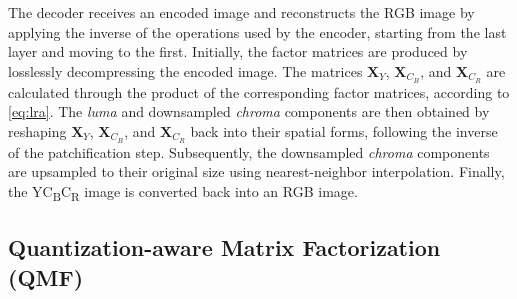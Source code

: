The decoder receives an encoded image and reconstructs the RGB image by applying the inverse of the operations used by the encoder, starting from the last layer and moving to the first. Initially, the factor matrices are produced by losslessly decompressing the encoded image. The matrices $\bm{X}_{Y}$, $\bm{X}_{C_B}$, and $\bm{X}_{C_R}$ are calculated through the product of the corresponding factor matrices, according to \eqref{eq:lra}. The \emph{luma} and downsampled \emph{chroma} components are then obtained by reshaping $\bm{X}_{Y}$, $\bm{X}_{C_B}$, and $\bm{X}_{C_R}$ back into their spatial forms, following the inverse of the patchification step. Subsequently, the downsampled \emph{chroma} components are upsampled to their original size using nearest-neighbor interpolation. Finally, the YC\textsubscript{B}C\textsubscript{R} image is converted back into an RGB image.


\subsection{Quantization-aware Matrix Factorization (QMF)} \label{sec:qmf}

